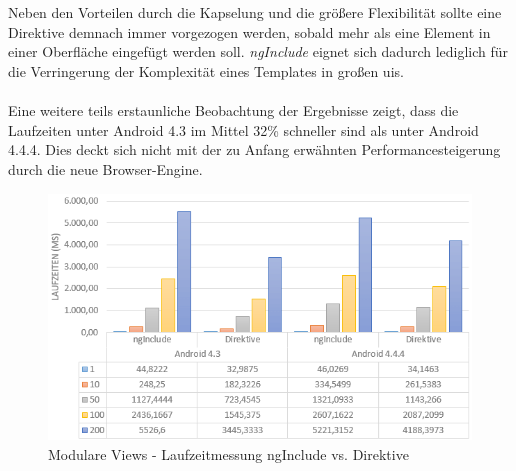 \\\\
Neben den Vorteilen durch die Kapselung und die größere Flexibilität sollte eine Direktive demnach immer vorgezogen werden, sobald mehr als eine Element in einer Oberfläche eingefügt werden soll. \emph{ngInclude} eignet sich dadurch lediglich für die Verringerung der Komplexität eines Templates in großen \glspl{ui}.
\\\\
Eine weitere teils erstaunliche Beobachtung der Ergebnisse zeigt, dass die Laufzeiten unter Android 4.3 im Mittel 32\% schneller sind als unter Android 4.4.4. Dies deckt sich nicht mit der zu Anfang erwähnten Performancesteigerung durch die neue Browser-Engine.
\begin{figure}[h]
	\centering
	\includegraphics[scale=0.9]{Bilder/Diagramme/ModulareViews.png}
	\caption{Modulare Views - Laufzeitmessung ngInclude vs. Direktive}
	\label{mv-benchjs-analyse}
\end{figure}